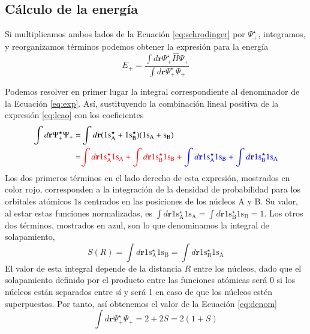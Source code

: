 \documentclass[notitlepage, amsmath,amssymb,
 aps,12pt,tightenlines]{revtex4-1}
\begin{document}
\subsection*{Cálculo de la energía}
Si multiplicamos ambos lados de la Ecuación 
\ref{eq:schrodinger} por $\Psi_+^\star$, integramos,
y reorganizamos términos podemos obtener la expresión 
para la energía
\begin{equation}
    E_+=\frac{\int d\mathbf{r}\Psi_+^\star\hat{H}\Psi_+}{\int d\mathbf{r}\Psi_+^\star\Psi_+}
    \label{eq:exp}
\end{equation}

Podemos resolver en primer lugar la integral correspondiente
al denominador de la Ecuación \ref{eq:exp}. Así, sustituyendo
la combinación lineal positiva de la expresión \ref{eq:lcao} 
con los coeficientes
\begin{equation}
\begin{split}
    \int d\mathbf{r}\Psi_+^\star\Psi_+ = &
    \int d\mathbf{r}(1\mathrm{s^\star_A}+1\mathrm{s^\star_B})(1\mathrm{s_A} +\mathrm{s_B})\\
    =& \color{red}{\int d\mathbf{r}1\mathrm{s^\star_A}1\mathrm{s_A}+
    \int d\mathbf{r}1\mathrm{s^\star_B}1\mathrm{s_B}}+
    {\color{blue}\int d\mathbf{r}1\mathrm{s^\star_A}1\mathrm{s_B}+
    \int d\mathbf{r}1\mathrm{s^\star_B}1\mathrm{s_A}}
    \label{eq:denom}
\end{split}
\end{equation}
Los dos primeros términos en el lado derecho de esta
expresión, mostrados en color rojo, corresponden a la
integración de la densidad  de probabilidad para los
orbitales atómicos $1\mathrm{s}$ centrados en las
posiciones de los núcleos A y B. Su valor, 
al estar estas funciones normalizadas, es 
$\int d\mathbf{r}1\mathrm{s^\star_A}1\mathrm{s_A}=\int d\mathbf{r}1\mathrm{s^\star_B}1\mathrm{s_B}=1$. 
Los otros dos términos, mostrados en azul, son lo que
denominamos la integral de solapamiento,
\begin{equation}
S(R) = \int d\mathbf{r}1\mathrm{s^\star_A}1\mathrm{s_B}=
    \int d\mathbf{r}1\mathrm{s^\star_B}1\mathrm{s_A}
\label{eq:overlap}
\end{equation}
El valor de esta integral depende de la distancia $R$
entre los núcleos, dado que el solapamiento definido por 
el producto entre las funciones atómicas será 0 si los núcleos
están separados entre sí y será 1 en caso de que los núcleos
estén superpuestos. Por tanto, así obtenemos el valor de 
la Ecuación \ref{eq:denom}
\begin{equation}
    \int d\mathbf{r}\Psi_+^\star\Psi_+ = 2 + 2S = 2(1+S)
\end{equation}
\end{document}
